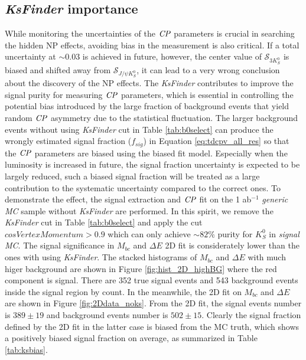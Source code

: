 \subsection{\textit{KsFinder} importance}
While monitoring the uncertainties of the $\it{CP}$ parameters is crucial in searching the hidden NP effects, avoiding bias in the measurement is also critical. If a total uncertainty at $\sim 0.03$ is achieved in future, however, the center value of $\mathcal{S}_{3K_S^0}$ is biased and shifted away from $\mathcal{S}_{J/\psi K_S^0}$, it can lead to a very wrong conclusion about the discovery of the NP effects.
The \textit{KsFinder} contributes to improve the signal purity for measuring $\it{CP}$ parameters, which is essential in controlling the potential bias introduced by the large fraction of background events that yield random $\it{CP}$ asymmetry due to the statistical fluctuation. The larger background events without using \textit{KsFinder} cut in Table \ref{tab:b0select} can produce the wrongly estimated signal fraction ($f_{sig}$) in Equation \ref{eq:tdcpv_all_res} so that the $\it{CP}$ parameters are biased using the biased fit model. Especially when the luminosity is increased in future, the signal fraction uncertainty is expected to be largely reduced, such a biased signal fraction will be treated as a large contribution to the systematic uncertainty compared to the correct ones. 
To demonstrate the effect,  the signal extraction and $\it{CP}$ fit on the 1 ab$^{-1}$ \textit{generic MC} sample without \textit{KsFinder} are performed. In this spirit, we remove the \textit{KsFinder} cut in Table \ref{tab:b0select} and apply the cut $cosVertexMomentum > 0.9$ which can only achieve $\sim 82\%$ purity for $K_S^0$ in \textit{signal MC}. The signal significance in $M_{bc}$ and $\Delta E$ 2D fit is considerately lower than the ones with using \textit{KsFinder}. The stacked histograms of $M_{bc}$ and $\Delta E$ with much higer background are shown in Figure \ref{fig:hist_2D_highBG} where the red component is signal. There are 352 true signal events and 543 background events inside the signal region by count. In the meanwhile, the 2D fit on $M_{bc}$ and $\Delta E$ are shown in Figure \ref{fig:2Ddata_noks}. From the 2D fit, the signal events number is $389\pm19$ and background events number is $502\pm15$. Clearly the signal fraction defined by the 2D fit in the latter case is biased from the MC truth, which shows a positively biased signal fraction on average, as summarized in Table \ref{tab:ksbias}.


